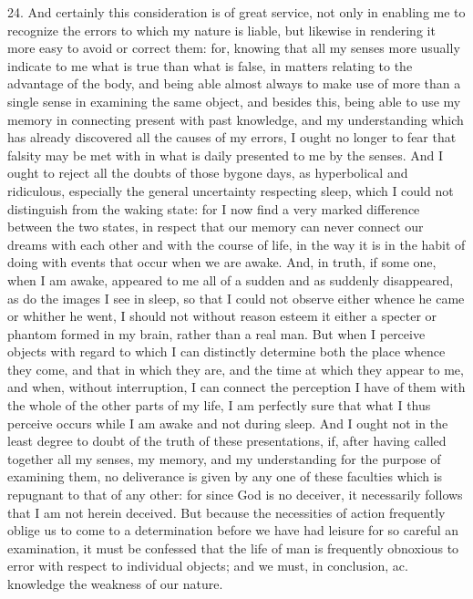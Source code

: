 24. And certainly this consideration is of great service, not only in enabling me to recognize the errors to which my nature is liable, but likewise in rendering it more easy to avoid or correct them: for, knowing that all my senses more usually indicate to me what is true than what is false, in matters relating to the advantage of the body, and being able almost always to make use of more than a single sense in examining the same object, and besides this, being able to use my memory in connecting present with past knowledge, and my understanding which has already discovered all the causes of my errors, I ought no longer to fear that falsity may be met with in what is daily presented to me by the senses. And I ought to reject all the doubts of those bygone days, as hyperbolical and ridiculous, especially the general uncertainty respecting sleep, which I could not distinguish from the waking state: for I now find a very marked difference between the two states, in respect that our memory can never connect our dreams with each other and with the course of life, in the way it is in the habit of doing with events that occur when we are awake. And, in truth, if some one, when I am awake, appeared to me all of a sudden and as suddenly disappeared, as do the images I see in sleep, so that I could not observe either whence he came or whither he went, I should not without reason esteem it either a specter or phantom formed in my brain, rather than a real man. But when I perceive objects with regard to which I can distinctly determine both the place whence they come, and that in which they are, and the time at which they appear to me, and when, without interruption, I can connect the perception I have of them with the whole of the other parts of my life, I am perfectly sure that what I thus perceive occurs while I am awake and not during sleep. And I ought not in the least degree to doubt of the truth of these presentations, if, after having called together all my senses, my memory, and my understanding for the purpose of examining them, no deliverance is given by any one of these faculties which is repugnant to that of any other: for since God is no deceiver, it necessarily follows that I am not herein deceived. But because the necessities of action frequently oblige us to come to a determination before we have had leisure for so careful an examination, it must be confessed that the life of man is frequently obnoxious to error with respect to individual objects; and we must, in conclusion, ac. knowledge the weakness of our nature.
